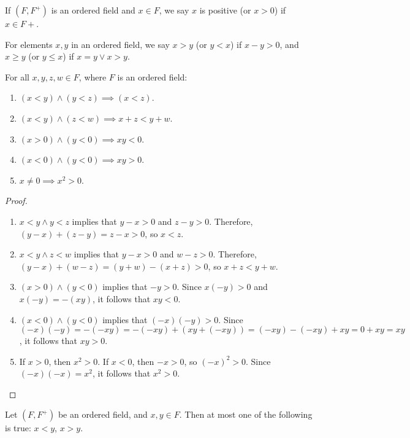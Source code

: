 If $(F, F^+)$ is an ordered field and $x \in F$, we say $x$ is positive (or $x > 0$) if $x \in F+$.

\begin{defn}
    For elements $x, y$ in an ordered field, we say $x > y$ (or $y < x$) if $x - y > 0$, and $x \geq y$ (or $y \leq x$) if $x = y \lor x > y$.
\end{defn}

\begin{thm} For all $x, y, z, w \in F$, where $F$ is an ordered field:
    \begin{enumerate}
        \item $(x < y) \land (y < z) \implies (x < z)$.
        \item $(x < y) \land (z < w) \implies x + z < y + w$.
        \item $(x > 0) \land (y < 0) \implies xy < 0$.
        \item $(x < 0) \land (y < 0) \implies xy > 0$.
        \item $x \neq 0 \implies x^2 > 0$.
    \end{enumerate}
\end{thm}

\begin{proof}\proofbreak
    \begin{enumerate}
        \item $x < y \land y < z$ implies that $y - x > 0$ and $z - y > 0$. Therefore, $(y - x) + (z - y) = z - x > 0$, so $x < z$.
        \item $x < y \land z < w$ implies that $y - x > 0$ and $w - z > 0$. Therefore, $(y - x) + (w - z) = (y + w) - (x + z) > 0$, so $x + z < y + w$.
        \item $(x > 0) \land (y < 0)$ implies that $-y > 0$. Since $x(-y) > 0$ and $x(-y) = -(xy)$, it follows that $xy < 0$.
        \item $(x < 0) \land (y < 0)$ implies that $(-x)(-y) > 0$. Since $(-x)(-y) = -(-xy) = -(-xy) + (xy  + (-xy)) = (-xy) - (-xy) + xy = 0 + xy = xy$, it follows that $xy > 0$.
        \item If $x > 0$, then $x^2 > 0$. If $x < 0$, then $-x > 0$, so $(-x)^2 > 0$. Since $(-x)(-x) = x^2$, it follows that $x^2 > 0$.
    \end{enumerate}
\end{proof}

\begin{prop}\label{trichotomy-exclusion}
    Let $(F, F^+)$ be an ordered field, and $x, y \in F$. Then at most one of the following is true: $x < y$, $x > y$.
\end{prop}

